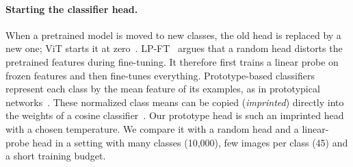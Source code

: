 \paragraph{Starting the classifier head.}
When a pretrained model is moved to new classes, the old head is replaced by a new one; ViT starts it at zero~\cite{dosovitskiy2021vit}.
LP-FT~\cite{kumar2022lpft} argues that a random head distorts the pretrained features during fine-tuning.
It therefore first trains a linear probe on frozen features and then fine-tunes everything.
Prototype-based classifiers represent each class by the mean feature of its examples, as in prototypical networks~\cite{snell2017prototypical}.
These normalized class means can be copied (\emph{imprinted}) directly into the weights of a cosine classifier~\cite{qi2018imprinted}.
Our prototype head is such an imprinted head with a chosen temperature.
We compare it with a random head and a linear-probe head in a setting with many classes (10,000), few images per class (45) and a short training budget.
